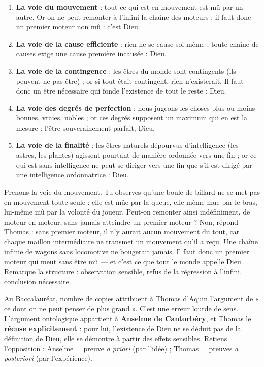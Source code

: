 \documentclass[11pt]{article}
\newcommand{\cle}[1]{{\popxbold\color{popdark}#1}}
\begin{document}
\begin{enumerate}
\item \textbf{La voie du mouvement} : tout ce qui est en mouvement est mû par un autre. Or on ne peut remonter à l'infini la chaîne des moteurs ; il faut donc un \cle{premier moteur} non mû : c'est Dieu.
\item \textbf{La voie de la cause efficiente} : rien ne se cause soi-même ; toute chaîne de causes exige une \cle{cause première} incausée : Dieu.
\item \textbf{La voie de la contingence} : les êtres du monde sont contingents (ils peuvent ne pas être) ; or si tout était contingent, rien n'existerait. Il faut donc un \cle{être nécessaire} qui fonde l'existence de tout le reste : Dieu.
\item \textbf{La voie des degrés de perfection} : nous jugeons les choses plus ou moins bonnes, vraies, nobles ; or ces degrés supposent un \cle{maximum} qui en est la mesure : l'être souverainement parfait, Dieu.
\item \textbf{La voie de la finalité} : les êtres naturels dépourvus d'intelligence (les astres, les plantes) agissent pourtant de manière ordonnée vers une fin ; or ce qui est sans intelligence ne peut se diriger vers une fin que s'il est dirigé par une \cle{intelligence ordonnatrice} : Dieu.
\end{enumerate}

\begin{exemplebox}
Prenons la voie du mouvement. Tu observes qu'une boule de billard ne se met pas en mouvement toute seule : elle est mûe par la queue, elle-même mue par le bras, lui-même mû par la volonté du joueur. Peut-on remonter ainsi indéfiniment, de moteur en moteur, sans jamais atteindre un premier moteur ? Non, répond Thomas : sans premier moteur, il n'y aurait aucun mouvement du tout, car chaque maillon intermédiaire ne transmet un mouvement qu'il a reçu. Une chaîne infinie de wagons sans locomotive ne bougerait jamais. Il faut donc un premier moteur qui meut sans être mû — et c'est ce que tout le monde appelle Dieu. Remarque la structure : observation sensible, refus de la régression à l'infini, conclusion nécessaire.
\end{exemplebox}

\begin{attention}
Au Baccalauréat, nombre de copies attribuent à Thomas d'Aquin l'argument de « ce dont on ne peut penser de plus grand ». C'est une erreur lourde de sens. L'argument ontologique appartient à \textbf{Anselme de Cantorbéry}, et Thomas le \textbf{récuse explicitement} : pour lui, l'existence de Dieu ne se déduit pas de la définition de Dieu, elle se démontre à partir des effets sensibles. Retiens l'opposition : Anselme = preuve \emph{a priori} (par l'idée) ; Thomas = preuves \emph{a posteriori} (par l'expérience).
\end{attention}
\end{document}
